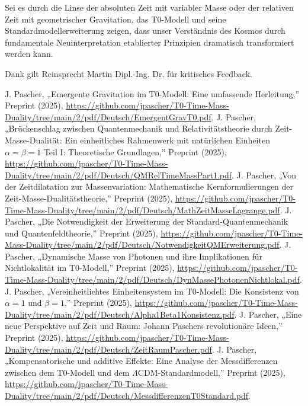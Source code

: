 \documentclass[twocolumn,aps,prl]{revtex4-2}
\begin{document}
	Sei es durch die Linse der absoluten Zeit mit variabler Masse oder der relativen Zeit mit geometrischer Gravitation, das T0-Modell und seine Standardmodellerweiterung zeigen, dass unser Verständnis des Kosmos durch fundamentale Neuinterpretation etablierter Prinzipien dramatisch transformiert werden kann.
	
	\begin{acknowledgments}
		Dank gilt Reinsprecht Martin Dipl.-Ing. Dr. für kritisches Feedback.
	\end{acknowledgments}
	
	\begin{thebibliography}{99}
		 J. Pascher, „Emergente Gravitation im T0-Modell: Eine umfassende Herleitung,'' Preprint (2025), \url{https://github.com/jpascher/T0-Time-Mass-Duality/tree/main/2/pdf/Deutsch/EmergentGravT0.pdf}.
		 J. Pascher, „Brückenschlag zwischen Quantenmechanik und Relativitätstheorie durch Zeit-Masse-Dualität: Ein einheitliches Rahmenwerk mit natürlichen Einheiten $\alpha = \beta = 1$ Teil I: Theoretische Grundlagen,'' Preprint (2025), \url{https://github.com/jpascher/T0-Time-Mass-Duality/tree/main/2/pdf/Deutsch/QMRelTimeMassPart1.pdf}.
		 J. Pascher, „Von der Zeitdilatation zur Massenvariation: Mathematische Kernformulierungen der Zeit-Masse-Dualitätstheorie,'' Preprint (2025), \url{https://github.com/jpascher/T0-Time-Mass-Duality/tree/main/2/pdf/Deutsch/MathZeitMasseLagrange.pdf}.
		 J. Pascher, „Die Notwendigkeit der Erweiterung der Standard-Quantenmechanik und Quantenfeldtheorie,'' Preprint (2025), \url{https://github.com/jpascher/T0-Time-Mass-Duality/tree/main/2/pdf/Deutsch/NotwendigkeitQMErweiterung.pdf}.
		 J. Pascher, „Dynamische Masse von Photonen und ihre Implikationen für Nichtlokalität im T0-Modell,'' Preprint (2025), \url{https://github.com/jpascher/T0-Time-Mass-Duality/tree/main/2/pdf/Deutsch/DynMassePhotonenNichtlokal.pdf}.
		 J. Pascher, „Vereinheitlichtes Einheitensystem im T0-Modell: Die Konsistenz von $\alpha = 1$ und $\beta = 1$,'' Preprint (2025), \url{https://github.com/jpascher/T0-Time-Mass-Duality/tree/main/2/pdf/Deutsch/Alpha1Beta1Konsistenz.pdf}.
		 J. Pascher, „Eine neue Perspektive auf Zeit und Raum: Johann Paschers revolutionäre Ideen,'' Preprint (2025), \url{https://github.com/jpascher/T0-Time-Mass-Duality/tree/main/2/pdf/Deutsch/ZeitRaumPascher.pdf}.
		 J. Pascher, „Kompensatorische und additive Effekte: Eine Analyse der Messdifferenzen zwischen dem T0-Modell und dem $\Lambda$CDM-Standardmodell,'' Preprint (2025), \url{https://github.com/jpascher/T0-Time-Mass-Duality/tree/main/2/pdf/Deutsch/MessdifferenzenT0Standard.pdf}.

\end{thebibliography}
\end{document}
